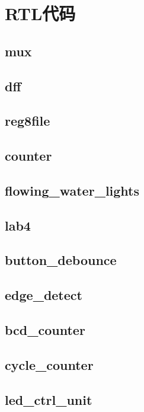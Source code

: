 \clearpage\appendix\section{RTL代码}


\subsection{mux}




\clearpage\subsection{dff}




\clearpage\subsection{reg8file}




\clearpage\subsection{counter}




\clearpage\subsection{flowing\_water\_lights}




\clearpage\subsection{lab4}




\clearpage\subsection{button\_debounce}




\clearpage\subsection{edge\_detect}




\clearpage\subsection{bcd\_counter}




\clearpage\subsection{cycle\_counter}




\clearpage\subsection{led\_ctrl\_unit}



